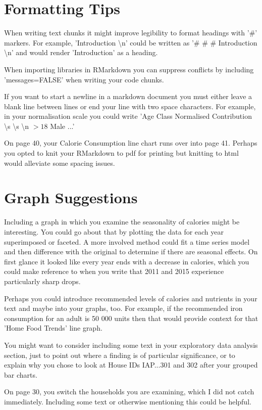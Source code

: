 \documentclass{article}
\begin{document}
\section{Formatting Tips}

When writing text chunks it might improve legibility to format headings with '\#' markers. For example, 'Introduction \textbackslash n' could be written as '\# \# \# Introduction \textbackslash n' and would render 'Introduction' as a heading.

When importing libraries in RMarkdown you can suppress conflicts by including 'messages=FALSE' when writing your code chunks.

If you want to start a newline in a markdown document you must either leave a blank line between lines or end your line with two space characters. For example, in your normalisation scale you could write 'Age Class Normalised Contribution \textbackslash s \textbackslash s \textbackslash n $>18$ Male ...'

On page 40, your Calorie Consumption line chart runs over into page 41. Perhaps you opted to knit your RMarkdown to pdf for printing but knitting to html would alleviate some spacing issues.

\section{Graph Suggestions}
Including a graph in which you examine the seasonality of calories might be interesting. You could go about that by plotting the data for each year superimposed or faceted. A more involved method could fit a time series model and then difference with the original to determine if there are seasonal effects. On first glance it looked like every year ends with a decrease in calories, which you could make reference to when you write that 2011 and 2015 experience particularly sharp drops.

Perhaps you could introduce recommended levels of calories and nutrients in your text and maybe into your graphs, too. For example, if the recommended iron consumption for an adult is 50 000 units then that would provide context for that 'Home Food Trends' line graph.

You might want to consider including some text in your exploratory data analysis section, just to point out where a finding is of particular significance, or to explain why you chose to look at House IDs IAP...301 and 302 after your grouped bar charts.

On page 30, you switch the households you are examining, which I did not catch immediately. Including some text or otherwise mentioning this could be helpful.
\end{document}
